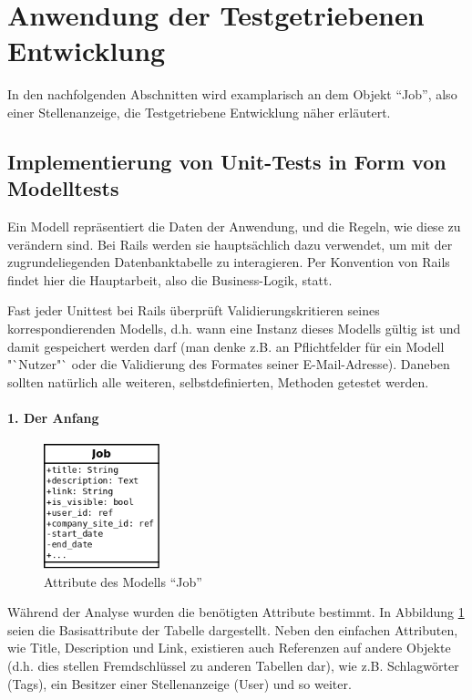 \section{Anwendung der Testgetriebenen Entwicklung}

In den nachfolgenden Abschnitten wird examplarisch an dem Objekt "`Job"', also einer Stellenanzeige, die Testgetriebene Entwicklung näher erläutert.
    
    
\subsection{Implementierung von Unit-Tests in Form von Modelltests}    

Ein Modell repräsentiert die Daten der Anwendung, und die Regeln, wie diese zu verändern sind. Bei Rails werden sie hauptsächlich dazu verwendet, um mit der zugrundeliegenden Datenbanktabelle zu interagieren. Per Konvention von Rails findet hier die Hauptarbeit, also die Business-Logik, statt.

Fast jeder Unittest bei Rails überprüft Validierungskritieren seines korrespondierenden Modells, d.h. wann eine Instanz dieses Modells gültig ist und damit gespeichert werden darf (man denke z.B. an Pflichtfelder für ein Modell "`Nutzer"` oder die Validierung des Formates seiner E-Mail-Adresse). Daneben sollten natürlich alle weiteren, selbstdefinierten, Methoden getestet werden.

\paragraph{1. Der Anfang}
\begin{figure}[h]
 \centering
 \includegraphics[width=0.3\textwidth]{../diagrams/job-erm.png}
 \caption{Attribute des Modells "`Job"'}
  \label{fig:job-erm}
\end{figure}

Während der Analyse wurden die benötigten Attribute bestimmt. In Abbildung \ref{fig:job-erm} seien die Basisattribute der Tabelle dargestellt. Neben den einfachen Attributen, wie Title, Description und Link, existieren auch Referenzen auf andere Objekte (d.h. dies stellen Fremdschlüssel zu anderen Tabellen dar), wie z.B. Schlagwörter (Tags), ein Besitzer einer Stellenanzeige (User) und so weiter.


